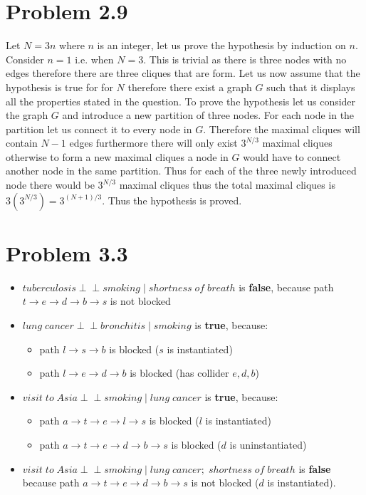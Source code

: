 \documentclass[11pt,a4paper,oneside]{report}
\newcommand\ci{\perp\!\!\!\perp} %
\begin{document}
\section*{Problem 2.9}
Let $N=3n$ where $n$ is an integer, let us prove the hypothesis by induction on $n$. Consider $n=1$ i.e. when $N=3$. This is trivial as there is three nodes with no edges therefore there are three cliques that are form. Let us now assume that the hypothesis is true for for $N$ therefore there exist a graph $G$ such that it displays all the properties stated in the question. To prove the hypothesis let us consider the graph $G$ and introduce a new partition of three nodes. For each node in the partition let us connect it to every node in $G$. Therefore the maximal cliques will contain $N-1$ edges furthermore there will only exist $3^{N/3}$ maximal cliques otherwise to form a new maximal cliques a node in $G$ would have to connect another node in the same partition. Thus for each of the three newly introduced node there would be $3^{N/3}$ maximal cliques thus the total maximal cliques is $3(3^{N/3}) = 3^{(N+1)/3}$. Thus the hypothesis is proved.

\section*{Problem 3.3}

\begin{itemize}
 \item $tuberculosis \ci smoking\;|\; shortness\;of\;breath$ is \textbf{false}, 
because path $t \to e \to d \to b \to s$ is not blocked
 \item $lung\;cancer \ci  bronchitis\;|\;smoking$ is \textbf{true}, because:
  \begin{itemize}
    \item path $l \to s \to b$ is blocked ($s$ is instantiated)
    \item path $l \to e \to d \to b$ is blocked (has collider ${e,d,b}$)
  \end{itemize}
 \item $visit \; to \; Asia \ci smoking\;|\;lung\;cancer$ is \textbf{true}, 
because:
   \begin{itemize}
    \item path $a \to t \to e \to l \to s$ is blocked ($l$ is instantiated)
    \item path $a \to t \to e \to d \to b \to s$ is blocked ($d$ is 
uninstantiated)
  \end{itemize}
 \item $visit \; to \; Asia \ci smoking\;|\;lung \; cancer; \; shortness \; of 
\; breath$ is \textbf{false} because path $a \to t \to e \to d \to b \to s$ is 
not blocked ($d$ is instantiated).
\end{itemize}
\end{document}
